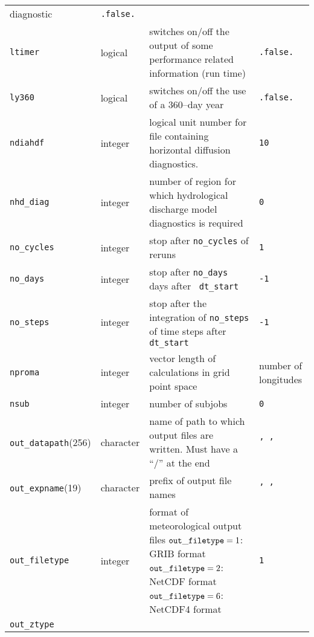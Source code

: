 \begin{longtable}{l@{\extracolsep\fill}lp{}p{3.5cm}}
  diagnostic & {\tt .false.}\\
{\tt ltimer}\index{namelist variables!ltimer}
 & logical & switches on/off the output of some
performance related information (run time) & {\tt .false.}\\
{\tt ly360}\index{namelist variables!ly360}
 & logical& switches on/off the use of a 360--day year &
  {\tt .false.}\\ 
{\tt ndiahdf}\index{namelist variables!ndiahdf}
  & integer & logical unit number for file containing
horizontal diffusion diagnostics. & {\tt 10} \\
{\tt nhd\_diag}\index{namelist variables!ndg\_diag}
 & integer   & number of region for which hydrological
  discharge  model diagnostics is required & {\tt 0}\\
{\tt no\_cycles}\index{namelist variables!no\_cycles}
 & integer  & stop after {\tt no\_cycles} of reruns &
{\tt 1} \\
{\tt no\_days}\index{namelist variables!no\_days}
 & integer  & stop after {\tt no\_days} days after {\tt
    dt\_start}& {\tt -1}\\
{\tt no\_steps}\index{namelist variables!no\_steps}
 & integer  & stop after the integration of {\tt no\_steps}
  of time steps after {\tt dt\_start} & {\tt -1} \\
{\tt nproma}\index{namelist variables!nproma}
 &integer     & vector length of calculations in grid point
  space & number of longitudes \\
{\tt nsub}\index{namelist variables!nsub}
 & integer       & number of subjobs & {\tt 0} \\ 
{\tt out\_datapath}(256)\index{namelist variables!out\_datapath}
 & character   & name of path to which output
files are written. Must have a
``/'' at the end & {\tt ' '} \\
{\tt out\_expname}(19)\index{namelist variables!out\_expname}
 &character & prefix of output file names & {\tt ' '} \\
{\tt out\_filetype}\index{namelist variables!out\_filetype}
 &integer  & format of meteorological output files \newline
                        ${\tt out\_filetype}=1$:  GRIB format \newline 
                        ${\tt out\_filetype}=2$:  NetCDF format
                        \newline 
                        ${\tt out\_filetype}=6$:  NetCDF4 format &
                        {\tt 1} \\
{\tt out\_ztype}\index{namelist variables!out\_ztype}

\end{longtable}
